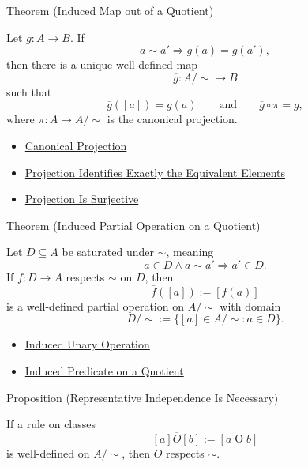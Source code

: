 \begin{theorembox}{Theorem (Induced Map out of a Quotient)}
\begin{theorem}
\label{thm:induced-map-out-of-quotient}
Let $g:A\to B$. If
\[
a\sim a'\Longrightarrow g(a)=g(a'),
\]
then there is a unique well-defined map
\[
\overline{g}:A/{\sim}\to B
\]
such that
\[
\overline{g}([a])=g(a)
\qquad\text{and}\qquad
\overline{g}\circ\pi=g,
\]
where $\pi:A\to A/{\sim}$ is the canonical projection.
\end{theorem}
\end{theorembox}

\begin{dependencies}
\begin{itemize}
  \item \hyperref[def:canonical-projection]{Canonical Projection}
  \item \hyperref[prop:projection-identifies-equivalent-elements]{Projection Identifies Exactly the Equivalent Elements}
  \item \hyperref[prop:projection-is-surjective]{Projection Is Surjective}
\end{itemize}
\end{dependencies}

\begin{theorembox}{Theorem (Induced Partial Operation on a Quotient)}
\begin{theorem}
\label{thm:induced-partial-operation-on-quotient}
Let $D\subseteq A$ be saturated under $\sim$, meaning
\[
a\in D\land a\sim a'\Longrightarrow a'\in D.
\]
If $f:D\to A$ respects $\sim$ on $D$, then
\[
\overline{f}([a]):=[f(a)]
\]
is a well-defined partial operation on $A/{\sim}$ with domain
\[
D/{\sim}:=\{[a]\in A/{\sim}:a\in D\}.
\]
\end{theorem}
\end{theorembox}

\begin{dependencies}
\begin{itemize}
  \item \hyperref[thm:induced-unary-operation-on-quotient]{Induced Unary Operation}
  \item \hyperref[thm:induced-predicate-on-quotient]{Induced Predicate on a Quotient}
\end{itemize}
\end{dependencies}

\begin{propositionbox}{Proposition (Representative Independence Is Necessary)}
\begin{proposition}
\label{prop:representative-independence-is-necessary}
If a rule on classes
\[
[a]\mathbin{\overline{O}}[b]:=[a\mathbin{O}b]
\]
is well-defined on $A/{\sim}$, then $O$ respects $\sim$.
\end{proposition}
\end{propositionbox}

